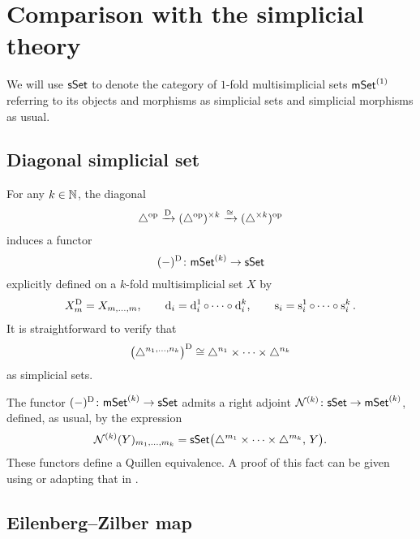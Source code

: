 
\section{Comparison with the simplicial theory}\label{s:comparison}

We will use $\mathsf{sSet}$ to denote the category of $1$-fold multisimplicial sets $\mathsf{mSet}^{(1)}$ referring to its objects and morphisms as simplicial sets and simplicial morphisms as usual.

\subsection{Diagonal simplicial set}\label{ss:diagonal}

For any $k \in \mathbb{N}$, the diagonal
\[
\triangle^{\mathrm{op}} \xrightarrow{\mathrm{D}}
(\triangle^{\mathrm{op}})^{\times k} \xrightarrow{\cong}
(\triangle^{\times k})^{\mathrm{op}}
\]
induces a functor
\[
(-)^{\mathrm{D}} \colon \mathsf{mSet}^{(k)} \to \mathsf{sSet}
\]
explicitly defined on a $k$-fold multisimplicial set $X$ by
\begin{gather*}
	X^{\mathrm{D}}_m = X_{m, \dots, m},
	\qquad
	\operatorname{d}_i = \operatorname{d}_i^1 \circ \dots \circ \operatorname{d}_i^k,
	\qquad
	\operatorname{s}_i = \operatorname{s}_i^1 \circ \dots \circ \operatorname{s}_i^k.
\end{gather*}
It is straightforward to verify that
\[
\big(\triangle^{n_1,\dots,n_k}\big)^{\mathrm{D}} \cong
\triangle^{n_1}\times\dots\times\triangle^{n_k}
\]
as simplicial sets.

The functor $(-)^{\mathrm{D}} \colon \mathsf{mSet}^{(k)} \to \mathsf{sSet}$ admits a right adjoint $\mathcal{N}^{(k)} \colon \mathsf{sSet} \to \mathsf{mSet}^{(k)}$, defined, as usual, by the expression
\[
\mathcal{N}^{(k)}(Y)_{m_1,\dots,m_k} =
\mathsf{sSet}\big( \triangle^{m_1} \times \dots \times \triangle^{m_k}, \, Y \big).
\]
These functors define a Quillen equivalence.
A proof of this fact can be given using \cite[Proposition~1.6.8]{maltsiniotis2005grothendieck} or adapting that in \cite[Proposition~1.2]{moerdijk1989bisimplicialsets}.

\subsection{Eilenberg--Zilber map}\label{ss:eilenber-zilber}

